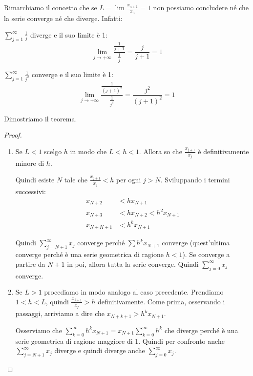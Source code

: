 Rimarchiamo il concetto che se $L = \lim \frac{x_{n+1}}{x_n} = 1$ non possiamo concludere né che la serie converge né che diverge. Infatti:
\begin{example}
$\sum_{j=1}^\infty \frac{1}{j}$ diverge e il suo limite è 1:
\begin{equation*}
\lim_{j \to +\infty} \frac{\frac{1}{j+1}}{\frac{1}{j}} = \frac{j}{j+1} = 1
\end{equation*}
\end{example}
\begin{example}
$\sum_{j=1}^\infty \frac{1}{j^2}$ converge e il suo limite è 1:
\begin{equation*}
\lim_{j \to +\infty} \frac{\frac{1}{(j+1)^2}}{\frac{1}{j^2}} = \frac{j^2}{(j+1)^2} = 1
\end{equation*}
\end{example}

Dimostriamo il teorema.
\begin{proof} \hfill
\begin{enumerate}
\item 
Se $L < 1$ scelgo $h$ in modo che $L < h < 1$. Allora so che $\frac{x_{j+1}}{x_j}$ è definitivamente minore di $h$.

Quindi esiste $N$ tale che $\frac{x_{j+1}}{x_j} < h$ per ogni $j > N$. Sviluppando i termini successivi:
\begin{align*}
x_{N+2} &< hx_{N+1} \\
x_{N+3} &< hx_{N+2} < h^2x_{N+1} \\
x_{N+K+1} &< h^kx_{N+1}
\end{align*} 

Quindi $\sum_{j=N+1}^\infty x_j$ converge perché $\sum h^kx_{N+1}$ converge (quest'ultima converge perché è una serie geometrica di ragione $h < 1$). Se converge a partire da $N+1$ in poi, allora tutta la serie converge. Quindi $\sum_{j=0}^\infty x_j$ converge.

\item
Se $L > 1$ procediamo in modo analogo al caso precedente. Prendiamo $1 < h < L$, quindi $\frac{x_{j+1}}{x_j} > h$ definitivamente. Come prima, osservando i passaggi, arriviamo a dire che $x_{N+k+1} > h^kx_{N+1}$.

Osserviamo che $\sum_{k=0}^\infty h^kx_{N+1} = x_{N+1}\sum_{k=0}^\infty h^k$ che diverge perché è una serie geometrica di ragione maggiore di 1. Quindi per confronto anche $\sum_{j=N+1}^\infty x_j$ diverge e quindi diverge anche $\sum_{j=0}^\infty x_j$.
\end{enumerate}
\end{proof}

